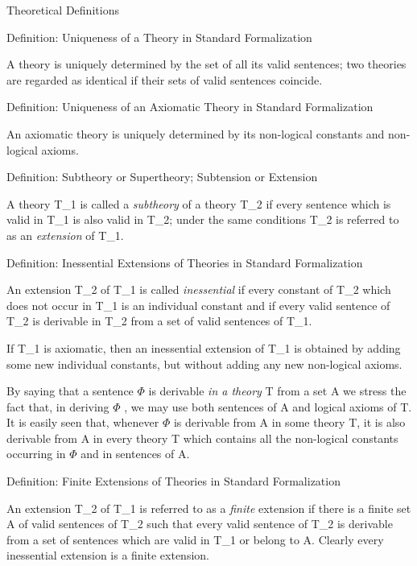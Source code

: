 \protect\hypertarget{anchor-28}{}{}Theoretical Definitions

\protect\hypertarget{anchor-29}{}{}Definition: Uniqueness of a Theory in
Standard Formalization

A theory is uniquely determined by the set of all its valid sentences;
two theories are regarded as identical if their sets of valid sentences
coincide.

\protect\hypertarget{anchor-30}{}{}Definition: Uniqueness of an
Axiomatic Theory in Standard Formalization

An axiomatic theory is uniquely determined by its non-logical constants
and non-logical axioms.

\protect\hypertarget{anchor-31}{}{}Definition: Subtheory or Supertheory;
Subtension or Extension

A theory T\_1 is called a \emph{subtheory} of a theory T\_2 if every
sentence which is valid in T\_1 is also valid in T\_2; under the same
conditions T\_2 is referred to as an \emph{extension} of T\_1.

\protect\hypertarget{anchor-32}{}{}Definition: Inessential Extensions of
Theories in Standard Formalization

An extension T\_2 of T\_1 is called \emph{inessential} if every constant
of T\_2 which does not occur in T\_1 is an individual constant and if
every valid sentence of T\_2 is derivable in T\_2 from a set of valid
sentences of T\_1.

If T\_1 is axiomatic, then an inessential extension of T\_1 is obtained
by adding some new individual constants, but without adding any new
non-logical axioms.

By saying that a sentence $\Phi$  is derivable \emph{in a theory} T from a set
A we stress the fact that, in deriving $\Phi$ , we may use both sentences of A
and logical axioms of T. It is easily seen that, whenever $\Phi$  is derivable
from A in some theory T, it is also derivable from A in every theory
T\textquotesingle{} which contains all the non-logical constants
occurring in $\Phi$  and in sentences of A.

\protect\hypertarget{anchor-33}{}{}Definition: Finite Extensions of
Theories in Standard Formalization

An extension T\_2 of T\_1 is referred to as a \emph{finite} extension if
there is a finite set A of valid sentences of T\_2 such that every valid
sentence of T\_2 is derivable from a set of sentences which are valid in
T\_1 or belong to A. Clearly every inessential extension is a finite
extension.

